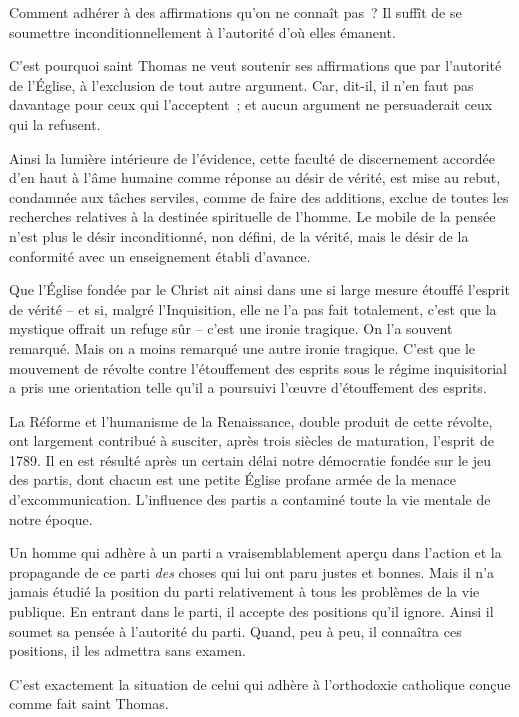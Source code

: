 \documentclass[french,twoside]{book} %
\begin{document}
Comment adhérer à des affirmations qu’on ne connaît pas ? Il suffît de se soumettre inconditionnellement à l’autorité d’où elles émanent.\par
C’est pourquoi saint Thomas ne veut soutenir ses affirmations que par l’autorité de l’Église, à l’exclusion de tout autre argument. Car, dit-il, il n’en faut pas davantage pour ceux qui l’acceptent ; et aucun argument ne persuaderait ceux qui la refusent.\par
Ainsi la lumière intérieure de l’évidence, cette faculté de discernement accordée d’en haut à l’âme humaine comme réponse au désir de vérité, est mise au rebut, condamnée aux tâches serviles, comme de faire des additions, exclue de toutes les recherches relatives à la destinée spirituelle de l’homme. Le mobile de la pensée n’est plus le désir inconditionné, non défini, de la vérité, mais le désir de la conformité avec un enseignement établi d’avance.\par
Que l’Église fondée par le Christ ait ainsi dans une si large mesure étouffé l’esprit de vérité – et si, malgré l’Inquisition, elle ne l’a pas fait totalement, c’est que la mystique offrait un refuge sûr – c’est une ironie tragique. On l’a souvent remarqué. Mais on a moins remarqué une autre ironie tragique. C’est que le mouvement de révolte contre l’étouffement des esprits sous le régime inquisitorial a pris une orientation telle qu’il a poursuivi l’œuvre d’étouffement des esprits.\par
La Réforme et l’humanisme de la Renaissance, double produit de cette révolte, ont largement contribué à susciter, après trois siècles de maturation, l’esprit de 1789. Il en est résulté après un certain délai notre démocratie fondée sur le jeu des partis, dont chacun est une petite Église profane armée de la menace d’excommunication. L’influence des partis a contaminé toute la vie mentale de notre époque.\par
Un homme qui adhère à un parti a vraisemblablement aperçu dans l’action et la propagande de ce parti \emph{des} choses qui lui ont paru justes et bonnes. Mais il n’a jamais étudié la position du parti relativement à tous les problèmes de la vie publique. En entrant dans le parti, il accepte des positions qu’il ignore. Ainsi il soumet sa pensée à l’autorité du parti. Quand, peu à peu, il connaîtra ces positions, il les admettra sans examen.\par
C’est exactement la situation de celui qui adhère à l’orthodoxie catholique conçue comme fait saint Thomas.\par
\end{document}
